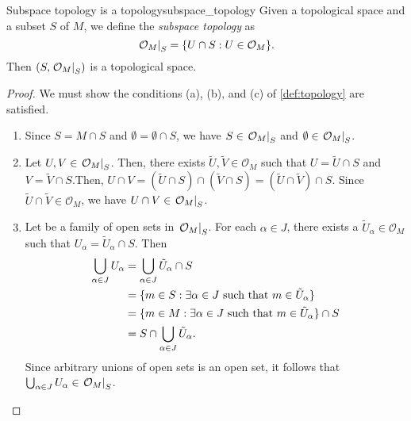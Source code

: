 \begin{proposition}{Subspace topology is a topology}{subspace_topology}
    Given a topological space  and a subset \(S\) of \(M\), we define the \emph{subspace topology}  as
    \begin{equation*}
        \left.\mathcal{O}_M\right\rvert_{S} = \{U \cap S : U \in \mathcal{O}_M\}.
    \end{equation*}
    Then \((S, \left.\mathcal{O}_M\right\rvert_{S})\) is a topological space.
\end{proposition}
\begin{proof}
    We must show the conditions (a), (b), and (c) of \cref{def:topology} are satisfied.
    \begin{enumerate}[label=(\alph*)]
        \item Since \(S = M \cap S\) and \(\emptyset = \emptyset \cap S\), we have \(S \in \left.\mathcal{O}_M\right\rvert_{S}\) and \(\emptyset \in \left.\mathcal{O}_M\right\rvert_{S}\).
        \item Let \(U, V \in \left.\mathcal{O}_M\right\rvert_{S}\). Then, there exists \(\tilde{U}, \tilde{V} \in \mathcal{O}_M\) such that \(U = \tilde{U} \cap S\) and \(V = \tilde{V} \cap S\).Then, \(U \cap V = (\tilde{U}\cap S) \cap (\tilde{V} \cap S) = (\tilde{U}\cap\tilde{V})\cap S\). Since \(\tilde{U} \cap \tilde{V} \in \mathcal{O}_M\), we have \(U \cap V \in \left.\mathcal{O}_M\right\rvert_{S}\).
        \item Let  be a family of open sets in \(\left.\mathcal{O}_M\right\rvert_{S}\). For each \(\alpha \in J\), there exists a \(\tilde{U}_\alpha\in\mathcal{O}_M\) such that \(U_\alpha = \tilde{U}_\alpha \cap S\). Then
            \begin{align*}
                \bigcup_{\alpha \in J} U_\alpha &= \bigcup_{\alpha \in J} \tilde{U}_\alpha \cap S\\
                                                &= \{m \in S : \exists \alpha \in J \text{ such that } m \in \tilde{U}_\alpha\}\\
                                                &= \{m \in M : \exists \alpha \in J \text{ such that } m \in \tilde{U}_\alpha\} \cap S\\
                                                &= S\cap\bigcup_{\alpha\in J}\tilde{U}_\alpha.
            \end{align*}
        Since arbitrary unions of open sets is an open set, it follows that \(\bigcup_{\alpha\in J}U_\alpha \in \left.\mathcal{O}_M\right\rvert_{S}\).
    \end{enumerate}
\end{proof}
